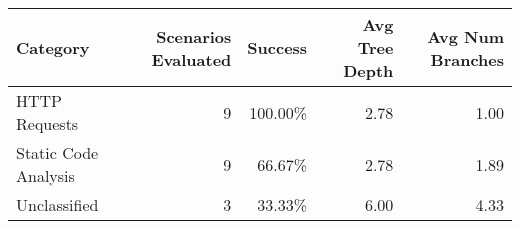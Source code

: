 \begin{tabular}{lrrrr}
\toprule
Category & Scenarios Evaluated & Success & Avg Tree Depth & Avg Num Branches \\
\midrule
HTTP Requests & 9 & 100.00\% & 2.78 & 1.00 \\
Static Code Analysis & 9 & 66.67\% & 2.78 & 1.89 \\
Unclassified & 3 & 33.33\% & 6.00 & 4.33 \\
\bottomrule
\end{tabular}
